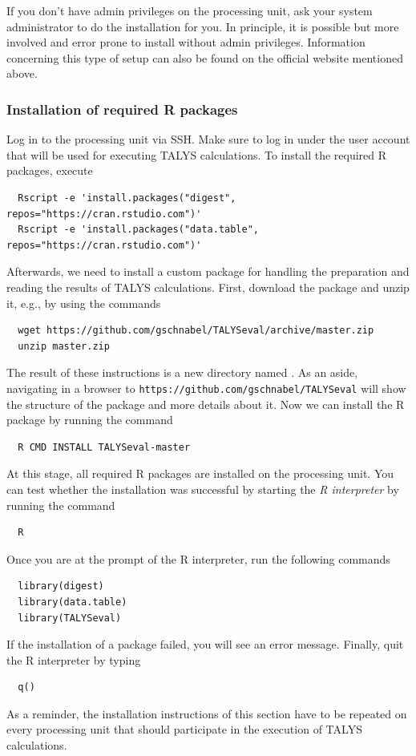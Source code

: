 \documentclass[12pt,a4paper]{scrartcl}
\begin{document}
If you don't have admin privileges on the processing unit, ask your system administrator to do the installation for you.
In principle, it is possible but more involved and error prone to install without admin privileges.
Information concerning this type of setup can also be found on the official website mentioned above.


\subsubsection{Installation of required R packages}

Log in to the processing unit via SSH.
Make sure to log in under the user account that will be used for executing  TALYS calculations.
To install the required R packages, execute
\begin{verbatim}
  Rscript -e 'install.packages("digest", repos="https://cran.rstudio.com")'
  Rscript -e 'install.packages("data.table", repos="https://cran.rstudio.com")'
\end{verbatim}
Afterwards, we need to install a custom package for handling the preparation and reading the results of TALYS calculations.
First, download the package and unzip it, e.g., by using the commands
\begin{verbatim}
  wget https://github.com/gschnabel/TALYSeval/archive/master.zip
  unzip master.zip
\end{verbatim}
The result of these instructions is a new directory named .
As an aside, navigating in a browser to \verb#https://github.com/gschnabel/TALYSeval# will show the structure of the package and more details about it.
Now we can install the R package by running the command
\begin{verbatim}
  R CMD INSTALL TALYSeval-master
\end{verbatim}
At this stage, all required R packages are installed on the processing unit.
You can test whether the installation was successful by starting the \textit{R interpreter} by running the command
\begin{verbatim}
  R
\end{verbatim}
Once you are at the prompt of the R interpreter, run the following commands
\begin{verbatim}
  library(digest)
  library(data.table)
  library(TALYSeval)
\end{verbatim}
If the installation of a package failed, you will see an error message.
Finally, quit the R interpreter by typing
\begin{verbatim}
  q()
\end{verbatim}
As a reminder, the installation instructions of this section have to be repeated on every processing unit that should participate in the execution of TALYS calculations.
\end{document}
